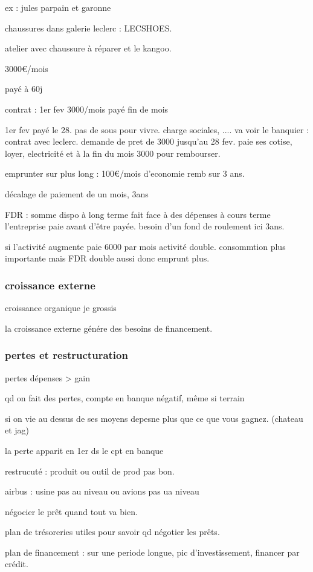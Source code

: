 \documentclass[a4paper,12pt]{article}
\begin{document}
ex : jules parpain et garonne

chaussures dans galerie leclerc : LECSHOES.

atelier avec chaussure à réparer et le kangoo.

3000€/mois

payé à 60j

contrat : 1er fev 3000/mois payé fin de mois

1er fev payé le 28. pas de sous pour vivre.
charge sociales, ....
va voir le banquier : contrat avec leclerc.
demande de pret de 3000 jusqu'au 28 fev.
paie ses cotise, loyer, electricité et à la fin du mois
3000 pour rembourser.

emprunter sur plus long : 100€/mois d'economie remb sur 3 ans.

décalage de paiement de un mois, 3ans

FDR : somme dispo à long terme fait face à des dépenses à cours terme
l'entreprise paie avant d'être payée. besoin d'un fond de roulement ici 3ans.


si l'activité augmente paie 6000 par mois activité double.
consommtion plus importante mais FDR double aussi donc emprunt plus.


\subsubsection{croissance externe}
croissance organique je grossis

la croissance externe génére des besoins de financement.


\subsubsection{pertes et restructuration}
pertes dépenses > gain

qd on fait des pertes, compte en banque négatif, même si terrain

si on vie au dessus de ses moyens depesne plus que ce que vous gagnez. (chateau et jag)

la perte apparit en 1er ds le cpt en banque

restrucuté : produit ou outil de prod pas bon.

airbus : usine pas au niveau ou avions pas ua niveau

négocier le prêt quand tout va bien.

plan de trésoreries utiles pour savoir qd négotier les prêts.

plan de financement : sur une periode longue, pic d'investissement, financer par crédit.
\end{document}
